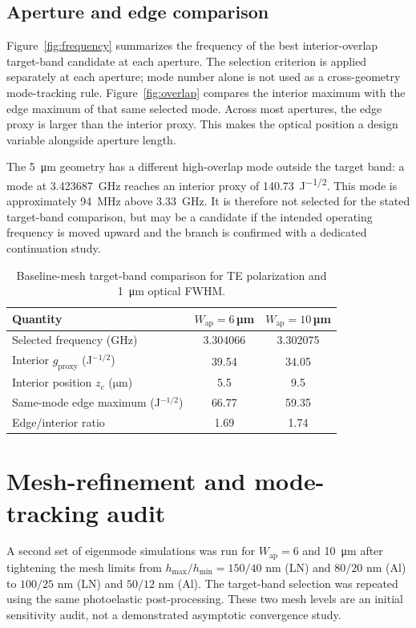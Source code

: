 \documentclass[10pt,twocolumn]{article}
\begin{document}
\subsection{Aperture and edge comparison}
Figure~\ref{fig:frequency} summarizes the frequency of the best interior-overlap target-band candidate at each aperture. The selection criterion is applied separately at each aperture; mode number alone is not used as a cross-geometry mode-tracking rule. Figure~\ref{fig:overlap} compares the interior maximum with the edge maximum of that same selected mode. Across most apertures, the edge proxy is larger than the interior proxy. This makes the optical position a design variable alongside aperture length.

The \SI{5}{\micro\meter} geometry has a different high-overlap mode outside the target band: a mode at \SI{3.423687}{\giga\hertz} reaches an interior proxy of \SI{140.73}{\joule^{-1/2}}. This mode is approximately \SI{94}{\mega\hertz} above \SI{3.33}{\giga\hertz}. It is therefore not selected for the stated target-band comparison, but may be a candidate if the intended operating frequency is moved upward and the branch is confirmed with a dedicated continuation study.
\begin{table}[t]\centering\caption{Baseline-mesh target-band comparison for TE polarization and \SI{1}{\micro\meter} optical FWHM.}\label{tab:comparison}\begin{tabular}{@{}lcc@{}}\toprule
Quantity & $W_{\mathrm{ap}}=6$\,µm & $W_{\mathrm{ap}}=10$\,µm\\\midrule
Selected frequency (GHz) & 3.304066 & 3.302075\\
Interior $g_{\mathrm{proxy}}$ (J$^{-1/2}$) & 39.54 & 34.05\\
Interior position $z_c$ ($\si{\micro\meter}$) & 5.5 & 9.5\\
Same-mode edge maximum (J$^{-1/2}$) & 66.77 & 59.35\\
Edge/interior ratio & 1.69 & 1.74\\\bottomrule\end{tabular}\end{table}
\section{Mesh-refinement and mode-tracking audit}
A second set of eigenmode simulations was run for $W_{\mathrm{ap}}=6$ and \SI{10}{\micro\meter} after tightening the mesh limits from $h_{\max}/h_{\min}=150/40$ nm (LN) and $80/20$ nm (Al) to $100/25$ nm (LN) and $50/12$ nm (Al). The target-band selection was repeated using the same photoelastic post-processing. These two mesh levels are an initial sensitivity audit, not a demonstrated asymptotic convergence study.
\end{document}
